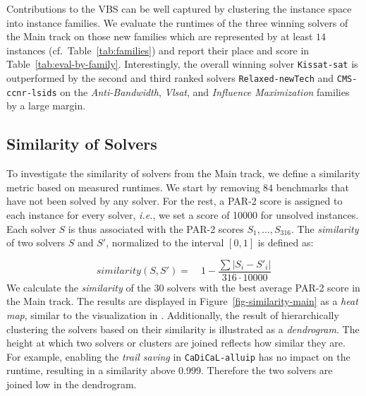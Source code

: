 \documentclass{elsarticle}
\newcommand{\solver}[1]{\texttt{#1}}
\begin{document}
Contributions to the VBS can be well captured by clustering the instance space into instance families. 
We evaluate the runtimes of the three winning solvers of the Main track on those new families which are represented by at least $14$ instances (cf.~Table~\ref{tab:families})
and report their place and score in Table~\ref{tab:eval-by-family}. 
Interestingly, the overall winning solver \solver{Kissat-sat} is outperformed by the second and third ranked solvers \solver{Relaxed-newTech} and \solver{CMS-ccnr-lsids} on the \emph{Anti-Bandwidth}, \emph{Vlsat}, and \emph{Influence Maximization} families by a large margin. 

\subsection{Similarity of Solvers}
To investigate the similarity of solvers from the Main track, we define a
similarity metric based on measured runtimes. We start by removing $84$
benchmarks that have not been solved by any solver. For the rest, a PAR-2 score
is assigned to each instance for every solver,
\emph{i.e.}, we set a score of \num{10000} for unsolved instances.
Each solver $S$ is thus associated with the PAR-2 scores $S_{1},\dots,S_{316}$.
The \emph{similarity} of two solvers $S$
and $S'$, normalized to the interval $[0,1]$ is defined
as:

\[
	similarity(S, S') =\quad 1 - \frac{\sum{|S_{i} - S'_{i}|}}{316 \cdot \num{10000}}
\]
We calculate the \emph{similarity} of the $30$ solvers with the
best average PAR-2 score in the Main track. The results are displayed in
Figure~\ref{fig-similarity-main} as a \emph{heat map}, similar to the visualization in \cite{Balyo:2015:SATRace}. Additionally, the result
of hierarchically clustering the solvers based on their similarity is
illustrated as a \emph{dendrogram}. The height at which two solvers or clusters
are joined reflects how similar they are. For example, enabling the \emph{trail
  saving} in \solver{CaDiCaL-alluip} has no impact on the runtime, resulting in
a similarity above \num{0.999}. Therefore the two solvers are joined low in the
dendrogram.
\end{document}

